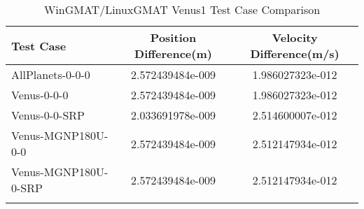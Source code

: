\begin{table}[htbp!]
\centering
\caption{ WinGMAT/LinuxGMAT Venus1 Test Case Comparison}
      \begin{tabular}{lcc}
      \hline\hline
          Test Case & Position Difference(m) & Velocity Difference(m/s) \\
         \hline
         AllPlanets-0-0-0 & 2.572439484e-009 & 1.986027323e-012 \\
         Venus-0-0-0 & 2.572439484e-009 & 1.986027323e-012 \\
         Venus-0-0-SRP & 2.033691978e-009 & 2.514600007e-012 \\
         Venus-MGNP180U-0-0 & 2.572439484e-009 & 2.512147934e-012 \\
         Venus-MGNP180U-0-SRP & 2.572439484e-009 & 2.512147934e-012 \\
      \hline\hline
      \label{Table: Venus1 WinGMAT-LinuxGMAT Table} 
\end{tabular}
\end{table}
